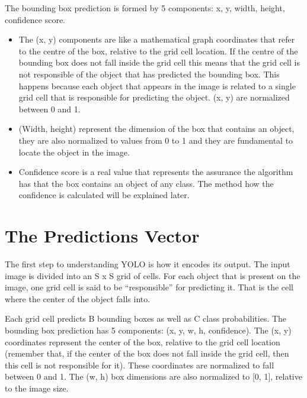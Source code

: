 The bounding box prediction is formed by 5 components: x, y, width,
height, confidence score.

\begin{itemize}
\item The (x, y) components are like a mathematical graph coordinates that
refer to the centre of the box, relative to the grid cell location. If the
centre of the bounding box does not fall inside the grid cell this means
that the grid cell is not responsible of the object that has predicted the
bounding box. This happens because each object that appears in the image is related to a single grid cell that is responsible for predicting the
object. (x, y) are normalized between 0 and 1.

\item (Width, height) represent the dimension of the box that contains an object,
they are also normalized to values from 0 to 1 and they are fundamental
to locate the object in the image.

\item Confidence score is a real value that represents the assurance the algorithm has that the box contains an object of any class. The method how
the confidence is calculated will be explained later.

\end{itemize}


\section{The Predictions Vector}
The first step to understanding YOLO is how it encodes its output. The input image is divided into an S x S grid of cells. For each object that is present on the image, one grid cell is said to be “responsible” for predicting it. That is the cell where the center of the object falls into. 

Each grid cell predicts B bounding boxes as well as C class probabilities. The bounding box prediction has 5 components: (x, y, w, h, confidence). The (x, y) coordinates represent the center of the box, relative to the grid cell location (remember that, if the center of the box does not fall inside the grid cell, then this cell is not responsible for it). These coordinates are normalized to fall between 0 and 1. The (w, h) box dimensions are also normalized to [0, 1], relative to the image size.

